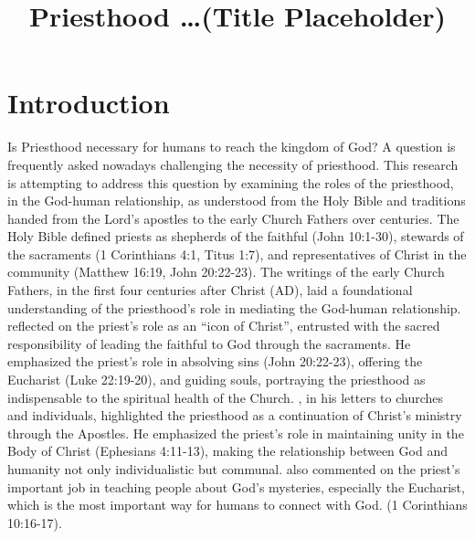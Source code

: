 \documentclass[12pt,doc]{apa7}   	%
\title{Priesthood \dots (Title Placeholder)}	%
\begin{document}
\maketitle

\renewcommand{\baselinestretch}{1}

\section{Introduction}
Is Priesthood necessary for humans to reach the kingdom of God?  A question is frequently asked nowadays challenging the necessity of priesthood.  This research is attempting to address this question by examining the roles of the priesthood, in the God-human relationship, as understood from the Holy Bible and traditions handed from the Lord's apostles to the early Church Fathers over centuries. The Holy Bible \citep{nelson_nkjv} defined priests as shepherds of the faithful (John 10:1-30), stewards of the sacraments (1 Corinthians 4:1, Titus 1:7), and representatives of Christ in the community (Matthew 16:19, John 20:22-23). The writings of the early Church Fathers, in the first four centuries after Christ (AD), laid a foundational understanding of the priesthood’s role in mediating the God-human relationship.  \citet{priesthood_chrysostom, complete_work_chrysostom} reflected on the priest’s role as an ``icon of Christ'', entrusted with the sacred responsibility of leading the faithful to God through the sacraments. He emphasized the priest’s role in absolving sins (John 20:22-23), offering the Eucharist (Luke 22:19-20), and guiding souls, portraying the priesthood as indispensable to the spiritual health of the Church.  \citet{epistles_ignatius}, in his letters to churches and individuals, highlighted the priesthood as a continuation of Christ’s ministry through the Apostles. He emphasized the priest’s role in maintaining unity in the Body of Christ (Ephesians 4:11-13), making the relationship between God and humanity not only individualistic but communal. \citet{st_basil_letters} also commented on the priest’s important job in teaching people about God’s mysteries, especially the Eucharist, which is the most important way for humans to connect with God. (1 Corinthians 10:16-17). 
\end{document}
